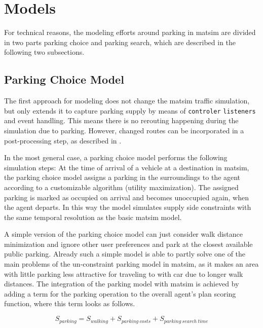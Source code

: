 \section{Models}
For technical reasons, the modeling efforts around parking in \gls{matsim} are divided in two parts parking choice and parking search, which are described in the following two subsections. 

\subsection{Parking Choice Model}
The first approach for modeling does not change the \gls{matsim} traffic simulation, but only extends it to capture parking supply by means of \lstinline|controler| \lstinline|listeners| and event handling. This means there is no rerouting happening during the simulation due to parking. However, changed routes can be incorporated in a post-processing step, as described in \citet[][]{WaraichAxhausen_TRR_2012}. 

In the most general case, a parking choice model performs the following simulation steps: At the time of arrival of a vehicle at a destination in \gls{matsim}, the parking choice model assigns a parking in the surroundings to the agent according to a customizable algorithm (\eg utility maximization). The assigned parking is marked as occupied on arrival and becomes unoccupied again, when the agent departs. In this way the model simulates supply side constraints with the same temporal resolution as the basic \gls{matsim} model.

A simple version of the parking choice model can just consider walk distance minimization and ignore other user preferences and park at the closest available public parking. Already such a simple model is able to partly solve one of the main problems of the un-constraint parking model in \gls{matsim}, as it makes an area with little parking less attractive for traveling to with car due to longer walk distances. The integration of the parking model with \gls{matsim} is achieved by adding a term for the parking operation to the overall agent’s plan scoring function, where this term looks as follows.

\begin{equation}
\label{eq:parkingutf}
S_{parking} = S_{walking} + S_{parking\ costs} + S_{parking\ search\ time}
\end{equation}

